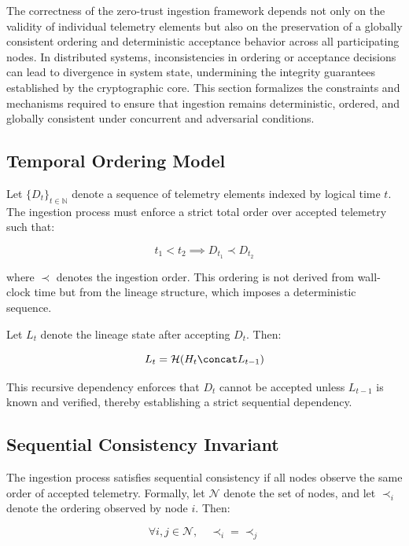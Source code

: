 The correctness of the zero-trust ingestion framework depends not only on the validity of individual telemetry elements but also on the preservation of a globally consistent ordering and deterministic acceptance behavior across all participating nodes. In distributed systems, inconsistencies in ordering or acceptance decisions can lead to divergence in system state, undermining the integrity guarantees established by the cryptographic core. This section formalizes the constraints and mechanisms required to ensure that ingestion remains deterministic, ordered, and globally consistent under concurrent and adversarial conditions.

\subsection{Temporal Ordering Model}

Let $\{D_t\}_{t \in \mathbb{N}}$ denote a sequence of telemetry elements indexed by logical time $t$. The ingestion process must enforce a strict total order over accepted telemetry such that:

\begin{equation}
t_1 < t_2 \implies D_{t_1} \prec D_{t_2}
\end{equation}

where $\prec$ denotes the ingestion order. This ordering is not derived from wall-clock time but from the lineage structure, which imposes a deterministic sequence.

Let $L_t$ denote the lineage state after accepting $D_t$. Then:

\begin{equation}
L_t = \mathcal{H}(H_t \concat L_{t-1})
\end{equation}

This recursive dependency enforces that $D_t$ cannot be accepted unless $L_{t-1}$ is known and verified, thereby establishing a strict sequential dependency.

\subsection{Sequential Consistency Invariant}

The ingestion process satisfies sequential consistency if all nodes observe the same order of accepted telemetry. Formally, let $\mathcal{N}$ denote the set of nodes, and let $\prec_i$ denote the ordering observed by node $i$. Then:

\begin{equation}
\forall i,j \in \mathcal{N}, \quad \prec_i = \prec_j
\end{equation}

